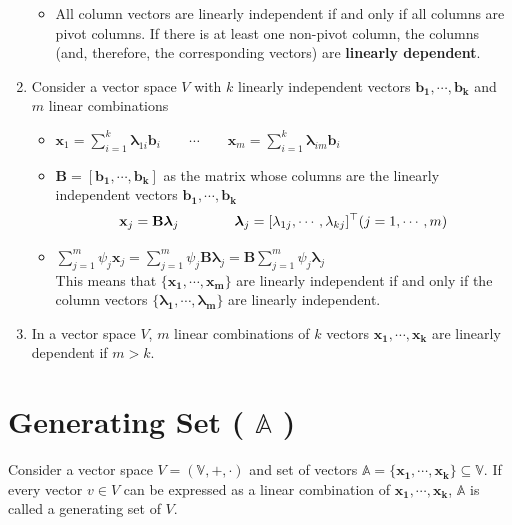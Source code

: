 \begin{enumerate}
\begin{itemize}
        \item All column vectors are linearly independent if and only if all columns are pivot columns. If there is at least one non-pivot column, the columns (and, therefore, the corresponding vectors) are \textbf{linearly dependent}.
    \end{itemize}

    \item Consider a vector space $V$ with $k$ linearly independent vectors $\mathbf{b_1, \cdots, b_k}$ and $m$ linear combinations
    \begin{itemize}
        \item \( \displaystyle \mathbf{x}_1  = \sum_{i=1}^{k} \bm{\lambda}_{1i} \mathbf{b}_i  \quad\quad\cdots\quad\quad \mathbf{x}_m = \sum_{i=1}^{k} \bm{\lambda}_{im} \mathbf{b}_i \)

        \item $\mathbf{B} = [\mathbf{b_1, \cdots, b_k}]$ as the matrix whose columns are the linearly independent vectors $\mathbf{b_1, \cdots, b_k}$
        \[
            \mathbf{x}_j = \mathbf{B{\bm{\lambda}}}_j \quad\quad\quad\quad \bm{\lambda}_j = [\lambda_{1j}, \cdots, \lambda_{kj}]^\top
            \hfill (j=1, \cdots,m)
        \]

        \item \( \displaystyle \sum_{j=1}^{m} \psi_j \mathbf{x}_j = \sum_{j=1}^{m} \psi_j \mathbf{B}\bm{\lambda}_j = \mathbf{B}\sum_{j=1}^{m} \psi_j \bm{\lambda}_j \)\\
        This means that $\{\mathbf{x_1, \cdots, x_m}\}$ are linearly independent if and only if the column vectors $\{\bm{\lambda_1, \cdots, \lambda_m}\}$ are linearly independent.

    \end{itemize}

    \item In a vector space $V$, $m$ linear combinations of $k$ vectors $\mathbf{x_1, \cdots, x_k}$ are linearly dependent if $m > k$.
\end{enumerate}







\section{Generating Set ( $\mathbb{A}$ ) \cite{mfml-1}}\label{Generating Set}
Consider a vector space $V = (\mathbb{V}, +, \cdot)$ and set of vectors $\mathbb{A} = \mathbf{\{x_1, \cdots , x_k\}} \subseteq \mathbb{V}$. If every vector $v \in V$ can be expressed as a linear combination of $\mathbf{x_1, \cdots , x_k}$, $\mathbb{A}$ is called a generating set of $V$.


